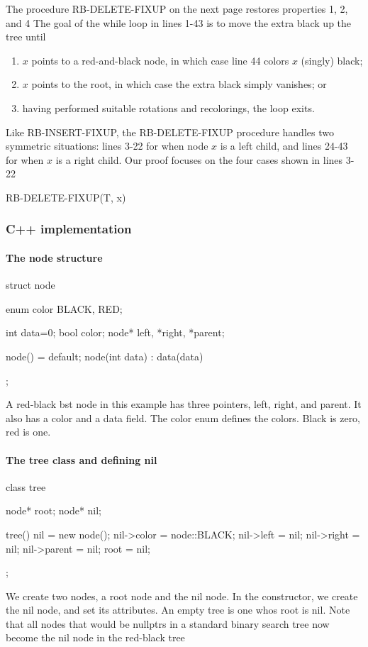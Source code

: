 \documentclass{report}
\begin{document}
\bigbreak \noindent 
The procedure RB-DELETE-FIXUP on the next page restores properties 1, 2, and 4
\bigbreak \noindent 
The goal of the while loop in lines 1-43 is to move the extra black up the tree until
\bigbreak \noindent 
\begin{enumerate}
    \item $x$ points to a red-and-black node, in which case line 44 colors $x$ (singly) black;
    \item $x$ points to the root, in which case the extra black simply vanishes; or
    \item having performed suitable rotations and recolorings, the loop exits. 
\end{enumerate}
\bigbreak \noindent 
Like RB-INSERT-FIXUP, the RB-DELETE-FIXUP procedure handles two symmetric situations: lines 3-22 for when node $x$ is a left child, and lines 24-43 for
when $x$ is a right child. Our proof focuses on the four cases shown in lines 3-22
\pagebreak \bigbreak \noindent 
\begin{cppcode}
RB-DELETE-FIXUP(T, x)
\end{cppcode}







\pagebreak
\subsubsection{C++ implementation}
\bigbreak \noindent 
\paragraph{The node structure}
\bigbreak \noindent \bigbreak \noindent 
\begin{cppcode}
    struct node {
        enum color {BLACK, RED};

        int data=0;
        bool color;
        node* left, *right, *parent;

        node() = default;
        node(int data) : data(data) {}
    };
\end{cppcode}
\bigbreak \noindent 
A red-black bst node in this example has three pointers, left, right, and parent. It also has a color  and a data field. The color enum defines the colors. Black is zero, red is one.
\bigbreak \noindent 
\paragraph{The tree class and defining nil}
\bigbreak \noindent \bigbreak \noindent 
\begin{cppcode}
    class tree {
        node* root;
        node* nil;

        tree() {
            nil = new node();
            nil->color = node::BLACK;
            nil->left = nil;
            nil->right = nil;
            nil->parent = nil;
            root = nil;
        }
    };
\end{cppcode}
\bigbreak \noindent 
We create two nodes, a root node and the nil node. In the constructor, we create the nil node, and set its attributes. An empty tree is one whos root is nil. Note that all nodes that would be nullptrs in a standard binary search tree now become the nil node in the red-black tree
\end{document}

